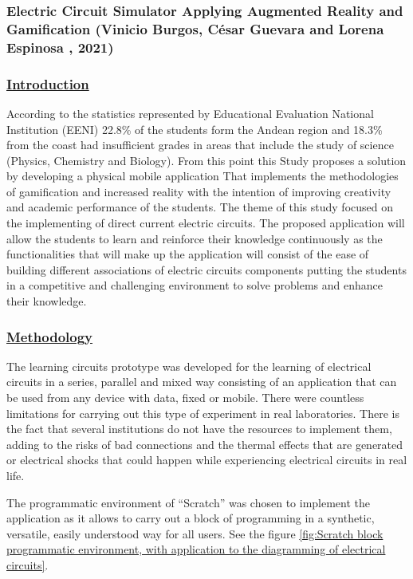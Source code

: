 \documentclass[../main.tex]{subfiles}
\begin{document}
\subsubsection{Electric Circuit Simulator Applying Augmented Reality and Gamiﬁcation (Vinicio Burgos, César Guevara and Lorena Espinosa , 2021)}

\subsubsection*{\underline{Introduction}}

According to the statistics represented by Educational Evaluation National Institution (EENI) 22.8\% of the students form the Andean region and 18.3\% from the coast had insufficient grades in areas that include the study of science (Physics, Chemistry and Biology). From this point this Study proposes a solution by developing a physical mobile application That implements the methodologies of gamification and increased reality with the intention of improving creativity and academic performance of the students. The theme of this study focused on the implementing of direct current electric circuits. The proposed application will allow the students to learn and reinforce their knowledge continuously as the functionalities that will make up the application will consist of the ease of building different associations of electric circuits components putting the students in a competitive and challenging environment to solve problems and enhance their knowledge. 

\subsubsection*{\underline{Methodology}}

The learning circuits prototype was developed for the learning of electrical circuits in a series, parallel and mixed way consisting of an application that can be used from any device with data, fixed or mobile. There were countless limitations for carrying out this type of experiment in real laboratories. There is the fact that several institutions do not have the resources to implement them, adding to the risks of bad connections and the thermal effects that are generated or electrical shocks that could happen while experiencing electrical circuits in real life. 

The programmatic environment of “Scratch” was chosen to implement the application as it allows to carry out a block of programming in a synthetic, versatile, easily understood way for all users. See the figure \ref{fig:Scratch block programmatic environment, with application to the diagramming of electrical circuits}.
\end{document}
